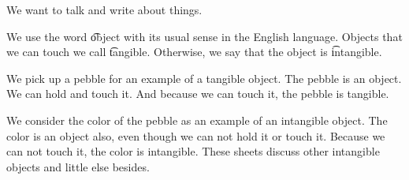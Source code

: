 

We want to talk and write about things.


We use the word \t{object} with its usual sense in the English language.
Objects that we can touch we call \t{tangible}.
Otherwise, we say that the object is \t{intangible}.


We pick up a pebble for an example of a tangible object.
The pebble is an object.
We can hold and touch it.
And because we can touch it, the pebble is tangible.

We consider the color of the pebble as an example of an intangible object.
The color is an object also, even though we can not hold it or touch it.
Because we can not touch it, the color is intangible.
These sheets discuss other intangible objects and little else besides.

\blankpage
